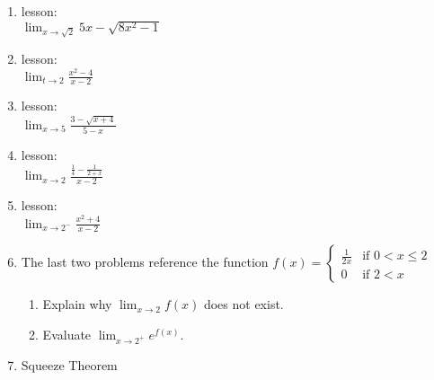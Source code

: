 \documentclass[11pt,fleqn]{article}
\begin{document}
\newpage
\begin{enumerate}
\item lesson:\\

$\displaystyle{\lim_{x \to \sqrt{2}} 5x -\sqrt{8x^2-1} }$
\vfill
\item lesson:\\

$\displaystyle{\lim_{t \to 2} \frac{x^2-4}{x-2} }$
\vfill
\item  lesson:\\

$\displaystyle{\lim_{x \to 5} \frac{3-\sqrt{x+4}}{5-x}}$
\vfill
\newpage
\item lesson:\\

$\displaystyle{\lim_{x \to 2} \frac{\frac{1}{4} - \frac{1}{2+x}}{x-2} }$
\vfill
\item lesson:\\

$\displaystyle{\lim_{x \to 2^-} \frac{x^2+4}{x-2} }$
\vfill
\item The last two problems reference the function $f(x) = \begin{cases} \frac{1}{2x} &\text{if } 0 < x \leq 2
\\ 0 &\text{if }  2<x \end{cases}$

\begin{enumerate}
\item Explain why $\displaystyle{\lim_{x \to 2} f(x)}$ does not exist.
\vfill
\item Evaluate $\displaystyle{\lim_{x \to 2^+} e^{f(x)}}.$
\end{enumerate}
\newpage
\item Squeeze Theorem
\end{enumerate}
\end{document}

